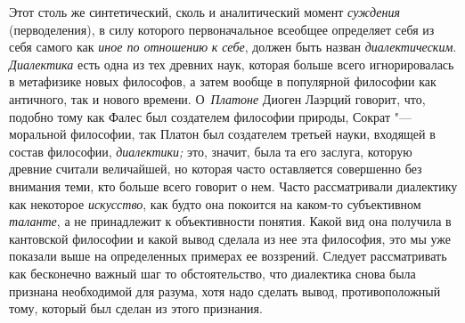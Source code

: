 Этот столь же синтетический, сколь и аналитический момент {\em суждения}
(перводеления), в силу которого первоначальное всеобщее
определяет себя из себя самого как
{\em иное по отношению} {\em к себе}, должен быть
назван {\em диалектическим}. {\em Диалектика} есть одна
из тех древних наук, которая больше всего игнорировалась в метафизике новых
философов, а затем вообще в популярной философии как античного, так и
нового времени. О~{\em Платоне}
Диоген Лаэрций говорит, что, подобно тому как Фалес был
создателем философии природы, Сократ "--- моральной философии,
так Платон был создателем третьей науки, входящей в состав философии,
{\em диалектики;} это,
значит, была та его заслуга, которую древние считали величайшей, но которая
часто оставляется совершенно без внимания теми, кто больше всего говорит о
нем. Часто рассматривали диалектику как некоторое {\em искусство}, как
будто она покоится на каком-то субъективном {\em таланте}, а не
принадлежит к объективности понятия. Какой вид она получила в кантовской
философии и какой вывод сделала из нее эта философия, это мы уже показали
выше на определенных примерах ее воззрений. Следует рассматривать как
бесконечно важный шаг то обстоятельство, что диалектика снова была признана
необходимой для разума, хотя надо сделать вывод, противоположный тому,
который был сделан из этого признания.

